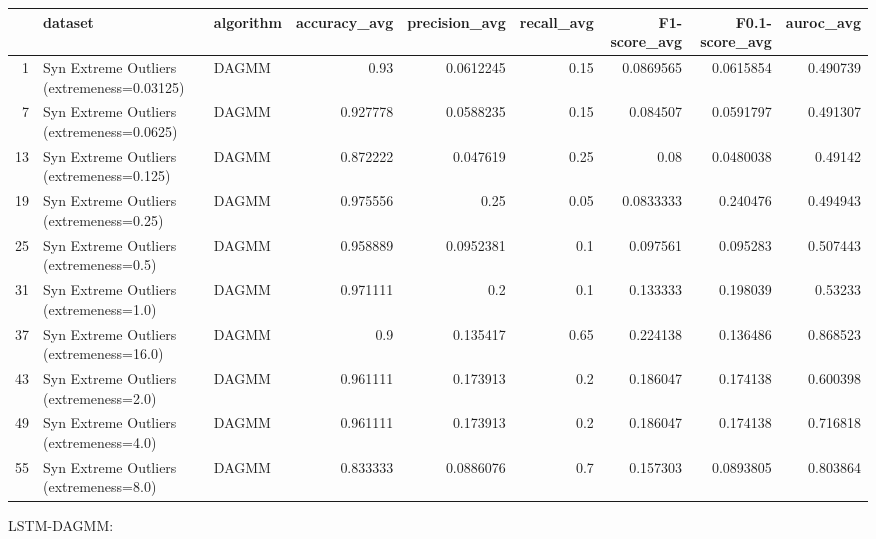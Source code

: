 \begin{tabular}{rllrrrrrr}
\hline
    & dataset                                    & algorithm   &   accuracy\_avg &   precision\_avg &   recall\_avg &   F1-score\_avg &   F0.1-score\_avg &   auroc\_avg \\
\hline
  1 & Syn Extreme Outliers (extremeness=0.03125) & DAGMM       &       0.93     &       0.0612245 &         0.15 &      0.0869565 &        0.0615854 &    0.490739 \\
  7 & Syn Extreme Outliers (extremeness=0.0625)  & DAGMM       &       0.927778 &       0.0588235 &         0.15 &      0.084507  &        0.0591797 &    0.491307 \\
 13 & Syn Extreme Outliers (extremeness=0.125)   & DAGMM       &       0.872222 &       0.047619  &         0.25 &      0.08      &        0.0480038 &    0.49142  \\
 19 & Syn Extreme Outliers (extremeness=0.25)    & DAGMM       &       0.975556 &       0.25      &         0.05 &      0.0833333 &        0.240476  &    0.494943 \\
 25 & Syn Extreme Outliers (extremeness=0.5)     & DAGMM       &       0.958889 &       0.0952381 &         0.1  &      0.097561  &        0.095283  &    0.507443 \\
 31 & Syn Extreme Outliers (extremeness=1.0)     & DAGMM       &       0.971111 &       0.2       &         0.1  &      0.133333  &        0.198039  &    0.53233  \\
 37 & Syn Extreme Outliers (extremeness=16.0)    & DAGMM       &       0.9      &       0.135417  &         0.65 &      0.224138  &        0.136486  &    0.868523 \\
 43 & Syn Extreme Outliers (extremeness=2.0)     & DAGMM       &       0.961111 &       0.173913  &         0.2  &      0.186047  &        0.174138  &    0.600398 \\
 49 & Syn Extreme Outliers (extremeness=4.0)     & DAGMM       &       0.961111 &       0.173913  &         0.2  &      0.186047  &        0.174138  &    0.716818 \\
 55 & Syn Extreme Outliers (extremeness=8.0)     & DAGMM       &       0.833333 &       0.0886076 &         0.7  &      0.157303  &        0.0893805 &    0.803864 \\
\hline
\end{tabular}

LSTM-DAGMM:

